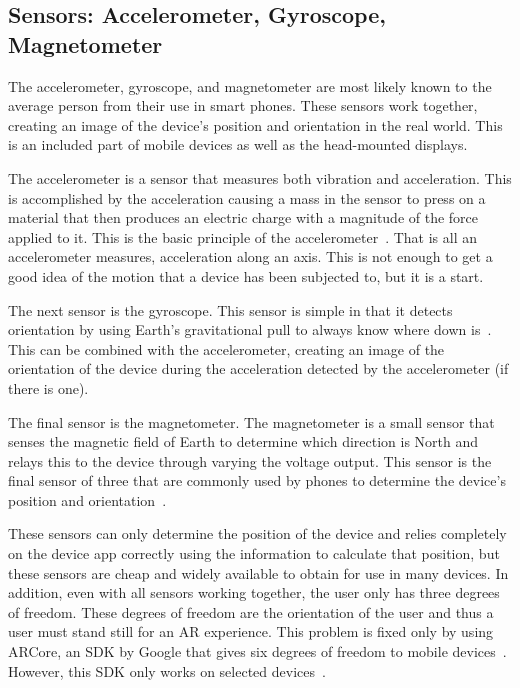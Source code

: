 \documentclass[10pt,draftclsnofoot,onecolumn,letterpaper]{IEEEtran}
\begin{document}
\subsection{Sensors: Accelerometer, Gyroscope, Magnetometer}
The accelerometer, gyroscope, and magnetometer are most likely known to the average person from their use in smart phones. These sensors work together, creating an image of the device's position and orientation in the real world. This is an included part of mobile devices as well as the head-mounted displays.\par
The accelerometer is a sensor that measures both vibration and acceleration. This is accomplished by the acceleration causing a mass in the sensor to press on a material that then produces an electric charge with a magnitude of the force applied to it. This is the basic principle of the accelerometer~\cite{Accel}. That is all an accelerometer measures, acceleration along an axis. This is not enough to get a good idea of the motion that a device has been subjected to, but it is a start.\par
The next sensor is the gyroscope. This sensor is simple in that it detects orientation by using Earth's gravitational pull to always know where down is~\cite{Gyro}. This can be combined with the accelerometer, creating an image of the orientation of the device during the acceleration detected by the accelerometer (if there is one).\par
The final sensor is the magnetometer. The magnetometer is a small sensor that senses the magnetic field of Earth to determine which direction is North and relays this to the device through varying the voltage output. This sensor is the final sensor of three that are commonly used by phones to determine the device's position and orientation~\cite{PhoneSense}.\par
These sensors can only determine the position of the device and relies completely on the device app correctly using the information to calculate that position, but these sensors are cheap and widely available to obtain for use in many devices. In addition, even with all sensors working together, the user only has three degrees of freedom. These degrees of freedom are the orientation of the user and thus a user must stand still for an AR experience. This problem is fixed only by using ARCore, an SDK by Google that gives six degrees of freedom to mobile devices~\cite{AR6dof}. However, this SDK only works on selected devices~\cite{ARdev}.
\end{document}
